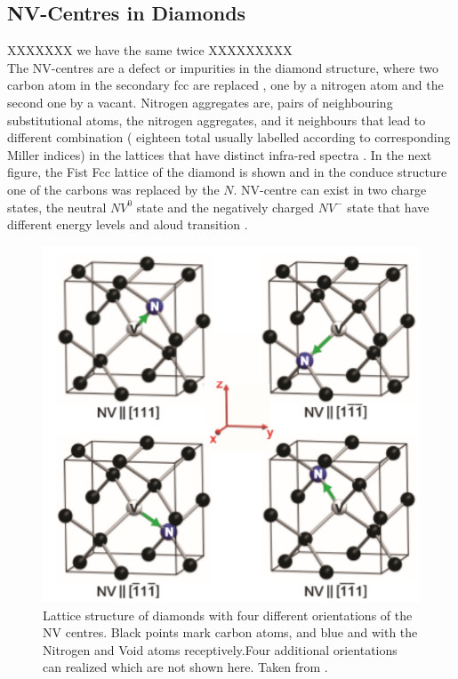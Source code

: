 \subsection{NV-Centres in Diamonds}
\label{sec:nvcentres}
 XXXXXXX we have the same twice XXXXXXXXX\\
 The NV-centres are a defect or impurities in the diamond structure, where two carbon atom in the secondary fcc are replaced , one by a nitrogen atom and the second one by a  vacant. Nitrogen aggregates are, pairs of neighbouring substitutional atoms, the nitrogen aggregates, and it neighbours that lead to different combination ( eighteen total usually labelled according to corresponding Miller indices) in the lattices that have distinct infra-red spectra \cite{sussmann_cvd_2009}. In the next figure, the Fist Fcc lattice of the diamond is shown and in the conduce structure one of the carbons was replaced by the $N$. NV-centre can exist in two charge states, the neutral $NV^{0}$ state and the negatively charged $NV^{-}$ state that have different energy levels and aloud transition \cite{pham_magnetic_nodate}.\\
 
 \begin{figure}
 	\centering
 	\includegraphics[width=0.7\linewidth]{../figures/NClatt}
 	\caption{Lattice structure of diamonds with four different orientations of the NV centres. Black points mark carbon atoms, and blue and with the Nitrogen and Void atoms receptively.Four additional orientations can realized which are not shown here. Taken from \cite{pham_magnetic_nodate}.}
 	\label{fig:nclatt}
 \end{figure}
 
